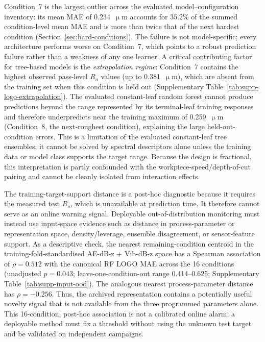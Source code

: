 Condition~7 is the largest outlier across the evaluated model--configuration
inventory: its mean MAE of 0.234~\(\upmu\)m accounts for 35.2\% of the
summed condition-level mean MAE and is more than
twice that of the next hardest condition (Section~\ref{sec:hard-conditions}).
The failure is not model-specific; every architecture performs worse on
Condition~7, which points to a robust prediction failure rather than a
weakness of any one learner. A critical contributing factor for tree-based
models is the \emph{extrapolation regime}: Condition~7 contains the
highest observed pass-level $R_a$ values (up to 0.381~\(\upmu\)m), which
are absent from the training set when this condition is held out
(Supplementary Table~\ref{tab:supp-logo-extrapolation}). The evaluated constant-leaf random forest cannot produce predictions beyond the range represented by its terminal-leaf training responses and therefore underpredicts near the training maximum of
0.259~\(\upmu\)m (Condition~8, the next-roughest condition), explaining the large
held-out-condition errors. This is a limitation of the evaluated
constant-leaf tree ensembles; it cannot be solved by spectral descriptors
alone unless the training data or model class supports the target range.
Because the design is fractional, this
interpretation is partly confounded with the workpiece-speed/depth-of-cut
pairing and cannot be cleanly isolated from interaction effects.

The training-target-support distance is a post-hoc diagnostic because it
requires the measured test \(R_a\), which is unavailable at prediction
time. It therefore cannot serve as an online warning signal. Deployable
out-of-distribution monitoring must instead use input-space evidence such
as distance in process-parameter or representation space, density/leverage,
ensemble disagreement, or sensor-feature support.
As a descriptive check, the nearest remaining-condition centroid in the
training-fold-standardised AE-dB-z + Vib-dB-z space has a Spearman
association of \(\rho = 0.512\) with the canonical RF LOGO MAE across the 16
conditions (unadjusted \(p=0.043\); leave-one-condition-out range
0.414--0.625; Supplementary Table~\ref{tab:supp-input-ood}). The analogous
nearest process-parameter distance has \(\rho = -0.256\). Thus, the archived
representation contains a potentially useful novelty signal that is not
available from the three programmed parameters alone. This 16-condition,
post-hoc association is not a calibrated online alarm; a deployable method
must fix a threshold without using the unknown test target and be validated
on independent campaigns.

